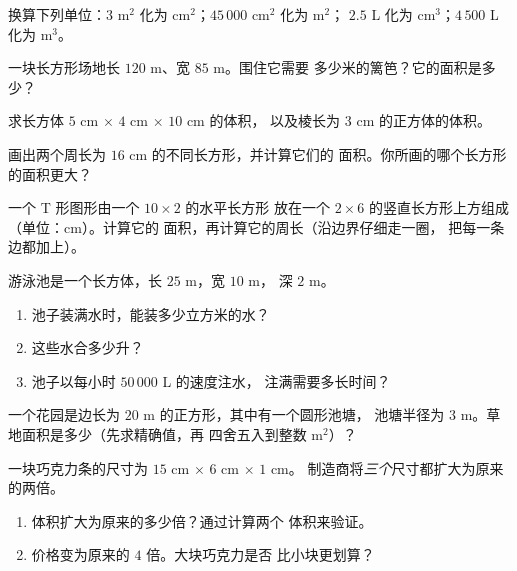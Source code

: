 \begin{exercise}[$\star$]\label{exo:g6:measure:5}
换算下列单位：$3$ m$^2$ 化为 cm$^2$；$45\,000$ cm$^2$ 化为 m$^2$；
$2.5$ L 化为 cm$^3$；$4\,500$ L 化为 m$^3$。
\end{exercise}

\begin{exercise}[$\star$]\label{exo:g6:measure:6}
一块长方形场地长 $120$ m、宽 $85$ m。围住它需要
多少米的篱笆？它的面积是多少？
\end{exercise}

\begin{exercise}[$\star$]\label{exo:g6:measure:7}
求长方体 $5$ cm $\times$ $4$ cm $\times$ $10$ cm 的体积，
以及棱长为 $3$ cm 的正方体的体积。
\end{exercise}

\begin{exercise}[$\star$]\label{exo:g6:measure:8}
画出两个周长为 $16$ cm 的不同长方形，并计算它们的
面积。你所画的哪个长方形的面积更大？
\end{exercise}

\begin{exercise}[$\star\star$]\label{exo:g6:measure:9}
一个 T 形图形由一个 $10 \times 2$ 的水平长方形
放在一个 $2 \times 6$ 的竖直长方形上方组成（单位：cm）。计算它的
面积，再计算它的周长（沿边界仔细走一圈，
把每一条边都加上）。
\end{exercise}

\begin{exercise}[$\star\star$]\label{exo:g6:measure:10}
游泳池是一个长方体，长 $25$ m，宽 $10$ m，
深 $2$ m。
\begin{enumerate}
  \item 池子装满水时，能装多少立方米的水？
  \item 这些水合多少升？
  \item 池子以每小时 $50\,000$ L 的速度注水，
        注满需要多长时间？
\end{enumerate}
\end{exercise}

\begin{exercise}[$\star\star$]\label{exo:g6:measure:11}
一个花园是边长为 $20$ m 的正方形，其中有一个圆形池塘，
池塘半径为 $3$ m。草地面积是多少（先求精确值，再
四舍五入到整数 m$^2$）？
\end{exercise}

\begin{exercise}[$\star\star\star$]\label{exo:g6:measure:12}
一块巧克力条的尺寸为 $15$ cm $\times$ $6$ cm $\times$ $1$ cm。
制造商将\emph{三个}尺寸都扩大为原来的两倍。
\begin{enumerate}
  \item 体积扩大为原来的多少倍？通过计算两个
        体积来验证。
  \item 价格变为原来的 $4$ 倍。大块巧克力是否
        比小块更划算？
\end{enumerate}
\end{exercise}

